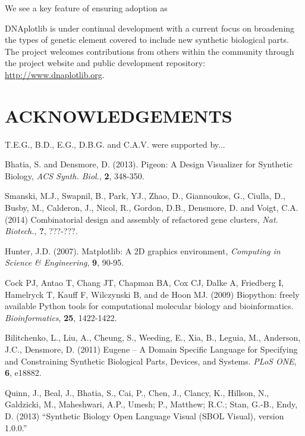 \documentclass{bioinfo}
\begin{document}
We see a key feature of ensuring adoption as 

DNAplotlib is under continual development with a current focus on broadening the types of genetic element covered to include new synthetic biological parts. The project welcomes contributions from others within the community through the project website and public development repository: \href{http://www.dnaplotlib.org}{http://www.dnaplotlib.org}.

\section*{ACKNOWLEDGEMENTS}
T.E.G., B.D., E.G., D.B.G. and C.A.V. were supported by...

\begin{thebibliography}{}
	
 Bhatia, S. and Densmore, D. (2013). Pigeon: A Design Visualizer for Synthetic Biology, {\it ACS Synth. Biol.}, {\bf 2}, 348-350.

 Smanski, M.J., Swapnil, B., Park, YJ., Zhao, D., Giannoukos, G., Ciulla, D., Busby, M., Calderon, J., Nicol, R., Gordon, D.B., Densmore, D. and Voigt, C.A. (2014) Combinatorial design and assembly of refactored gene clusters, {\it Nat. Biotech.}, {\bf ?}, ???-???.

 Hunter, J.D. (2007). Matplotlib: A 2D graphics environment, {\it Computing in Science \& Engineering}, {\bf 9}, 90-95.

Cock PJ, Antao T, Chang JT, Chapman BA, Cox CJ, Dalke A, Friedberg I, Hamelryck T, Kauff F, Wilczynski B, and de Hoon MJ. (2009) Biopython: freely available Python tools for computational molecular biology and bioinformatics. {\it Bioinformatics}, {\bf 25}, 1422-1422.

Bilitchenko, L., Liu, A., Cheung, S., Weeding, E., Xia, B., Leguia, M., Anderson, J.C., Densmore, D. (2011) Eugene – A Domain Specific Language for Specifying and Constraining Synthetic Biological Parts, Devices, and Systems. {\it PLoS ONE}, {\bf 6}, e18882.

Quinn, J., Beal, J., Bhatia, S., Cai, P., Chen, J., Clancy, K., Hillson, N., Galdzicki, M., Maheshwari, A.P., Umesh; P., Matthew; R.C.; Stan, G.-B., Endy, D. (2013) ``Synthetic Biology Open Language Visual (SBOL Visual), version 1.0.0.''

\end{thebibliography}
\end{document}
